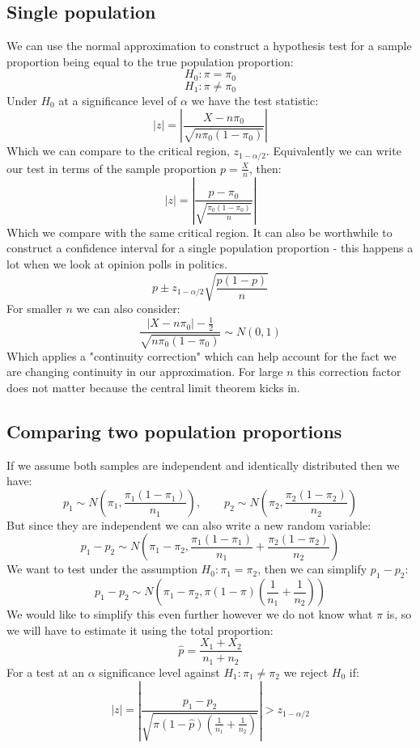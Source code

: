 \documentclass[12pt]{article}
\begin{document}
\subsection*{Single population}
We can use the normal approximation to construct a hypothesis test for a sample proportion being equal to the true population proportion:
\[H_0:\pi=\pi_0\]
\[H_1:\pi\ne\pi_0\]
Under \(H_0\) at a significance level of \(\alpha\) we have the test statistic:
\[|z|=\left|\frac{X-n\pi_0}{\sqrt{n\pi_0(1-\pi_0)}}\right|\]
Which we can compare to the critical region, \(z_{1-\alpha/2}\). Equivalently we can write our test in terms of the sample proportion \(p=\frac{X}{n}\), then:
\[|z|=\left|\frac{p-\pi_0}{\sqrt{\frac{\pi_0(1-\pi_0)}{n}}}\right|\]
Which we compare with the same critical region. It can also be worthwhile to construct a confidence interval for a single population proportion - this happens a lot when we look at opinion polls in politics.
\[p\pm z_{1-\alpha/2}\sqrt{\frac{p(1-p)}{n}}\]
For smaller \(n\) we can also consider:
\[\frac{|X-n\pi_0|-\frac{1}{2}}{\sqrt{n\pi_0(1-\pi_0)}}\sim N(0,1)\]
Which applies a "continuity correction" which can help account for the fact we are changing continuity in our approximation. For large \(n\) this correction factor does not matter because the central limit theorem kicks in.
\subsection*{Comparing two population proportions}
If we assume both samples are independent and identically distributed then we have:
\[p_1\sim N\left(\pi_1,\frac{\pi_1(1-\pi_1)}{n_1}\right),\qquad p_2\sim N\left(\pi_2,\frac{\pi_2(1-\pi_2)}{n_2}\right)\]
But since they are independent we can also write a new random variable:
\[p_1-p_2\sim N\left(\pi_1-\pi_2,\frac{\pi_1(1-\pi_1)}{n_1}+\frac{\pi_2(1-\pi_2)}{n_2}\right)\]
We want to test under the assumption \(H_0:\pi_1=\pi_2\), then we can simplify \(p_1-p_2\):
\[p_1-p_2\sim N\left(\pi_1-\pi_2,\pi(1-\pi)\left(\frac{1}{n_1}+\frac{1}{n_2}\right)\right)\]
We would like to simplify this even further however we do not know what \(\pi\) is, so we will have to estimate it using the total proportion:
\[\hat{p}=\frac{X_1+X_2}{n_1+n_2}\]
For a test at an \(\alpha\) significance level against \(H_1:\pi_1\ne \pi_2\) we reject \(H_0\) if:
\[|z|=\left|\frac{p_1-p_2}{\sqrt{\hat{\pi}(1-\hat{p})\left(\frac{1}{n_1}+\frac{1}{n_2}\right)}}\right|>z_{1-\alpha/2}\]
\end{document}
